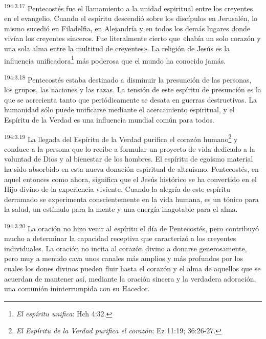 \par
\textsuperscript{194:3.17} Pentecostés fue el llamamiento a la unidad espiritual entre los creyentes en el evangelio. Cuando el espíritu descendió sobre los discípulos en Jerusalén, lo mismo sucedió en Filadelfia, en Alejandría y en todos los demás lugares donde vivían los creyentes sinceros. Fue literalmente cierto que «había un solo corazón y una sola alma entre la multitud de creyentes». La religión de Jesús es la influencia unificadora\footnote{\textit{El espíritu unifica}: Hch 4:32.} más poderosa que el mundo ha conocido jamás.

\par
\textsuperscript{194:3.18} Pentecostés estaba destinado a disminuir la presunción de las personas, los grupos, las naciones y las razas. La tensión de este espíritu de presunción es la que se acrecienta tanto que periódicamente se desata en guerras destructivas. La humanidad sólo puede unificarse mediante el acercamiento espiritual, y el Espíritu de la Verdad es una influencia mundial común para todos.

\par
\textsuperscript{194:3.19} La llegada del Espíritu de la Verdad purifica el corazón humano\footnote{\textit{El Espíritu de la Verdad purifica el corazón}: Ez 11:19; 36:26-27.} y conduce a la persona que lo recibe a formular un proyecto de vida dedicado a la voluntad de Dios y al bienestar de los hombres. El espíritu de egoísmo material ha sido absorbido en esta nueva donación espiritual de altruismo. Pentecostés, en aquel entonces como ahora, significa que el Jesús histórico se ha convertido en el Hijo divino de la experiencia viviente. Cuando la alegría de este espíritu derramado se experimenta conscientemente en la vida humana, es un tónico para la salud, un estímulo para la mente y una energía inagotable para el alma.

\par
\textsuperscript{194:3.20} La oración no hizo venir al espíritu el día de Pentecostés, pero contribuyó mucho a determinar la capacidad receptiva que caracterizó a los creyentes individuales. La oración no incita al corazón divino a donarse generosamente, pero muy a menudo cava unos canales más amplios y más profundos por los cuales los dones divinos pueden fluir hasta el corazón y el alma de aquellos que se acuerdan de mantener así, mediante la oración sincera y la verdadera adoración, una comunión ininterrumpida con su Hacedor.

